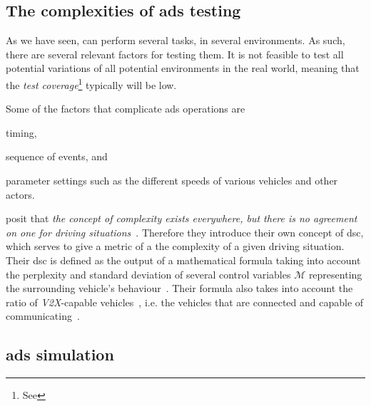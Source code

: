 \subsection{The complexities of \acrshort{ads} testing}\label{sec:adsTestingComplexity}

As we have seen,  can perform several tasks, in several environments. As such, there
are several relevant factors for testing them. It is not feasible to test all potential variations
of all potential environments in the real world, meaning that the \textit{test
    coverage}\footnote{See } typically will be low.

Some of the factors that complicate \acrshort{ads} operations are \begin{inparaenum}
    \item timing,
    \item sequence of events, and
    \item parameter settings such as the different speeds of various vehicles and other actors.
\end{inparaenum}

\citeauthor{adsComplexityIndex18} posit that \textit{the concept of complexity exists everywhere,
    but there is no agreement on one for driving situations}~\cite[1182]{adsComplexityIndex18}.
Therefore they introduce their own concept of \acrfull{dsc}, which serves to give a metric of a
the complexity of a given driving situation. Their \acrshort{dsc} is defined as the output of a
mathematical formula taking into account the perplexity and standard deviation of several
control variables $\mathcal{M}$ representing the surrounding vehicle's
behaviour~\cite[1182]{adsComplexityIndex18}. Their formula also takes into account the ratio of
\textit{V2X}-capable vehicles~\cite[1182]{adsComplexityIndex18}, i.e. the vehicles that are
connected and capable of communicating~\cite[1]{v2xTestingSurvey2019}.


\subsection{\acrlong{ads} simulation}

